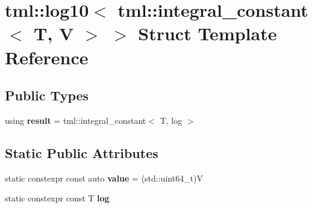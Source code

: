 \hypertarget{structtml_1_1log10_3_01tml_1_1integral__constant_3_01T_00_01V_01_4_01_4}{\section{tml\+:\+:log10$<$ tml\+:\+:integral\+\_\+constant$<$ T, V $>$ $>$ Struct Template Reference}
\label{structtml_1_1log10_3_01tml_1_1integral__constant_3_01T_00_01V_01_4_01_4}
}
\subsection*{Public Types}
\begin{DoxyCompactItemize}
\item 
\hypertarget{structtml_1_1log10_3_01tml_1_1integral__constant_3_01T_00_01V_01_4_01_4_a023009684d421e86ed7d7f3bc6361480}{using {\bfseries result} = tml\+::integral\+\_\+constant$<$ T, log $>$}\label{structtml_1_1log10_3_01tml_1_1integral__constant_3_01T_00_01V_01_4_01_4_a023009684d421e86ed7d7f3bc6361480}

\end{DoxyCompactItemize}
\subsection*{Static Public Attributes}
\begin{DoxyCompactItemize}
\item 
\hypertarget{structtml_1_1log10_3_01tml_1_1integral__constant_3_01T_00_01V_01_4_01_4_acf33cd8e69d9b48d65e2b1d0fd8eac5b}{static constexpr const auto {\bfseries value} = (std\+::uint64\+\_\+t)V}\label{structtml_1_1log10_3_01tml_1_1integral__constant_3_01T_00_01V_01_4_01_4_acf33cd8e69d9b48d65e2b1d0fd8eac5b}

\item 
static constexpr const T {\bfseries log}
\end{DoxyCompactItemize}


